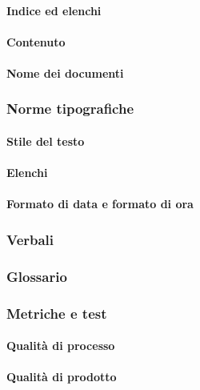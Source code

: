 \paragraph{Indice ed elenchi} 

\paragraph{Contenuto} 

\paragraph{Nome dei documenti} 

\subsubsection{Norme tipografiche}

\paragraph{Stile del testo}

\paragraph{Elenchi} 

\paragraph{Formato di data e formato di ora} 

\subsubsection{Verbali}
\subsubsection{Glossario}

\subsubsection{Metriche e test}
\paragraph{Qualità di processo} 

\paragraph{Qualità di prodotto} 

